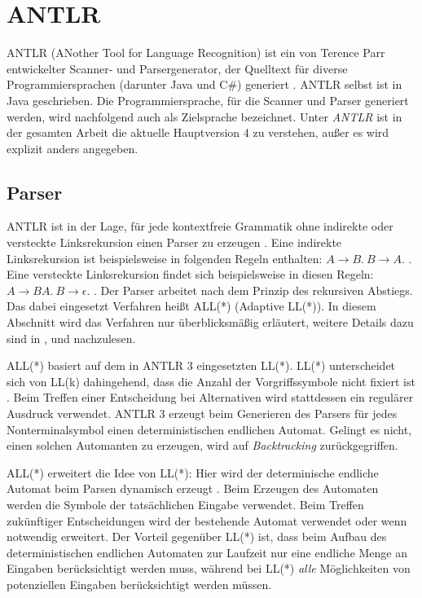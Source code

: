 \section{ANTLR}

ANTLR (ANother Tool for Language Recognition) ist ein von Terence Parr entwickelter Scanner- und Parsergenerator, der Quelltext für diverse Programmiersprachen (darunter Java und C\#{}) generiert \cite{ANTLR4Reference} \cite{ANTLRWebsite}. ANTLR selbst ist in Java geschrieben. Die Programmiersprache, für die Scanner und Parser generiert werden, wird nachfolgend auch als Zielsprache bezeichnet. Unter \emph{ANTLR} ist in der gesamten Arbeit die aktuelle Hauptversion 4 zu verstehen, außer es wird explizit anders angegeben.

\subsection{Parser}

ANTLR ist in der Lage, für jede kontextfreie Grammatik ohne indirekte oder versteckte Linksrekursion einen Parser zu erzeugen \cite{ANTLRALLStar}. Eine indirekte Linksrekursion ist beispielsweise in folgenden Regeln enthalten: $A \rightarrow B.\ B \rightarrow A.$ \cite{ANTLRALLStar}. Eine versteckte Linksrekursion findet sich beispielsweise in diesen Regeln: $A \rightarrow B A.\ B \rightarrow \epsilon.$ \cite{ANTLRALLStar}. Der Parser arbeitet nach dem Prinzip des rekursiven Abstiegs. Das dabei eingesetzt Verfahren heißt ALL(*) (Adaptive LL(*)). In diesem Abschnitt wird das Verfahren nur überblicksmäßig erläutert, weitere Details dazu sind in \cite{ANTLR4Reference}, \cite{ANTLRLLStar} und \cite{ANTLRALLStar} nachzulesen.

ALL(*) basiert auf dem in ANTLR 3 eingesetzten LL(*). LL(*) unterscheidet sich von LL(k) dahingehend, dass die Anzahl der Vorgriffssymbole nicht fixiert ist \cite{ANTLRLLStar}. Beim Treffen einer Entscheidung bei Alternativen wird stattdessen ein regulärer Ausdruck verwendet. ANTLR 3 erzeugt beim Generieren des Parsers für jedes Nonterminalsymbol einen deterministischen endlichen Automat. Gelingt es nicht, einen solchen Automanten zu erzeugen, wird auf \emph{Backtracking} zurückgegriffen.

ALL(*) erweitert die Idee von LL(*): Hier wird der determinische endliche Automat beim Parsen dynamisch erzeugt \cite{ANTLRALLStar}. Beim Erzeugen des Automaten werden die Symbole der tatsächlichen Eingabe verwendet. Beim Treffen zukünftiger Entscheidungen wird der bestehende Automat verwendet oder wenn notwendig erweitert. Der Vorteil gegenüber LL(*) ist, dass beim Aufbau des deterministischen endlichen Automaten zur Laufzeit nur eine endliche Menge an Eingaben berücksichtigt werden muss, während bei LL(*) \emph{alle} Möglichkeiten von potenziellen Eingaben berücksichtigt werden müssen.

